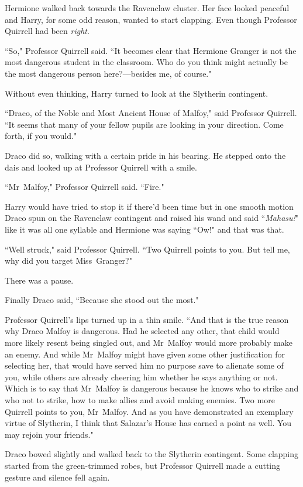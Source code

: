 Hermione walked back towards the Ravenclaw cluster. Her face looked peaceful and Harry, for some odd reason, wanted to start clapping. Even though Professor Quirrell had been \emph{right}.

``So," Professor Quirrell said. ``It becomes clear that Hermione Granger is not the most dangerous student in the classroom. Who do you think might actually be the most dangerous person here?—besides me, of course."

Without even thinking, Harry turned to look at the Slytherin contingent.

``Draco, of the Noble and Most Ancient House of Malfoy," said Professor Quirrell. ``It seems that many of your fellow pupils are looking in your direction. Come forth, if you would."

Draco did so, walking with a certain pride in his bearing. He stepped onto the dais and looked up at Professor Quirrell with a smile.

``Mr~Malfoy," Professor Quirrell said. ``Fire."

Harry would have tried to stop it if there'd been time but in one smooth motion Draco spun on the Ravenclaw contingent and raised his wand and said ``\emph{Mahasu!}" like it was all one syllable and Hermione was saying ``Ow!" and that was that.

``Well struck," said Professor Quirrell. ``Two Quirrell points to you. But tell me, why did you target Miss~Granger?"

There was a pause.

Finally Draco said, ``Because she stood out the most."

Professor Quirrell's lips turned up in a thin smile. ``And that is the true reason why Draco Malfoy is dangerous. Had he selected any other, that child would more likely resent being singled out, and Mr~Malfoy would more probably make an enemy. And while Mr~Malfoy might have given some other justification for selecting her, that would have served him no purpose save to alienate some of you, while others are already cheering him whether he says anything or not. Which is to say that Mr~Malfoy is dangerous because he knows who to strike and who not to strike, how to make allies and avoid making enemies. Two more Quirrell points to you, Mr~Malfoy. And as you have demonstrated an exemplary virtue of Slytherin, I think that Salazar's House has earned a point as well. You may rejoin your friends."

Draco bowed slightly and walked back to the Slytherin contingent. Some clapping started from the green-trimmed robes, but Professor Quirrell made a cutting gesture and silence fell again.

